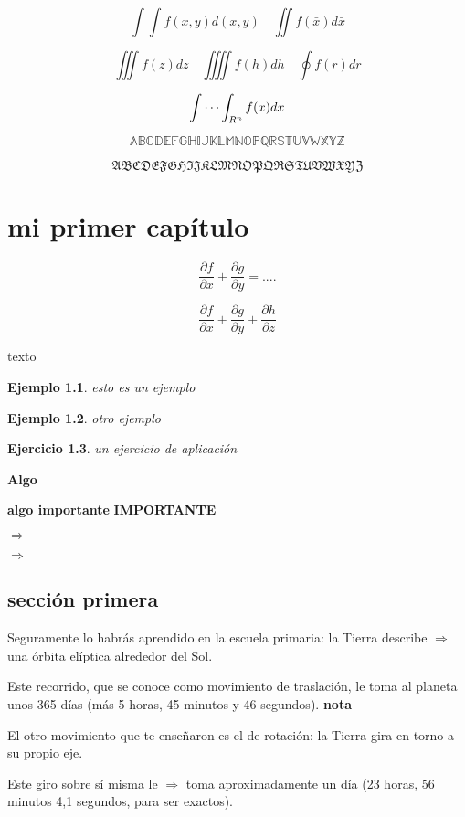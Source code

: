 \documentclass{report}
\newcommand*{\fd}{\Longrightarrow}
\newcommand*{\impo}{\bfseries\Large}
\newcommand{\negrita}[1]{\textbf{#1}}
\newcommand{\deri}[2]{\frac{\partial #1}{\partial #2}}
\newtheorem{ej}{Ejemplo}
\newtheorem{ejr}[ej]{Ejercicio}
\theoremstyle{definition}
\theoremstyle{remark}
\begin{document}
$$
\int\int f(x,y) d(x,y)\quad \iint f(\bar{x})d\bar{x}
$$

$$
\iiint f(z)dz\quad\iiiint f(h)dh\quad \oint f(r)dr
$$

$$
\idotsint_{R^n} f(x)dx
$$

$$
\mathbb{ABCDEFGHIJKLMNOPQRSTUVWXYZ}
$$

$$
\mathfrak{ABCDEFGHIJKLMNOPQRSTUVWXYZ}
$$




	
	
\newpage

\tableofcontents	
	
\setcounter{chapter}{5}	

\chapter{mi primer capítulo}
$$
\frac{\partial f}{\partial x}+\frac{\partial g}{\partial y}= ....
$$

$$
\deri{f}{x}+\deri{g}{y}+\deri{h}{z}
$$

texto

\begin{ej}
	esto es un ejemplo
\end{ej}

\begin{ej}
	otro ejemplo
\end{ej}

\begin{ejr}
	un ejercicio de aplicación
\end{ejr}	

{\bfseries\Large Algo}

\textbf{algo importante}  \negrita{IMPORTANTE}

$\Longrightarrow$

$\fd$


\section{sección primera}
Seguramente lo habrás aprendido en la escuela primaria: la Tierra describe $\fd$ una órbita elíptica alrededor del Sol.

Este recorrido, que se conoce como movimiento de traslación, le toma al planeta unos 365 días 
(más 5 horas, 45 minutos y 46 segundos). {\impo nota}

El otro movimiento que te enseñaron es el de rotación: la Tierra gira en torno a su propio eje.

Este giro sobre sí misma le $\fd$ toma aproximadamente un día (23 horas, 56 minutos 4,1 segundos, para ser exactos). 
\end{document}
